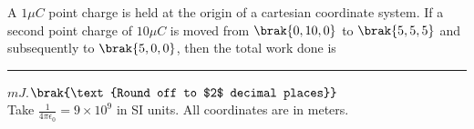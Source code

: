 \iffalse
	\title{2021-EE-27-39}
	\author{EE24Btech11006 - Arnav Mahishi}
	\section{ee}
	\chapter{2021}
\fi
\item{
 A $1\mu C$ point charge is held at the origin of a cartesian coordinate system. If a second point charge of $10\mu C$ is moved from $\brak{0,10,0}$ to $\brak{5,5,5}$ and subsequently to $\brak{5,0,0}$, then the total work done is \rule{2cm}{0.15mm}$mJ$.$\brak{\text{Round off to $2$ decimal places}}$\\
 Take $\frac{1}{4\pi\epsilon_{0}}=9\times 10^9$ in SI units. All coordinates are in meters.
 \\
}
